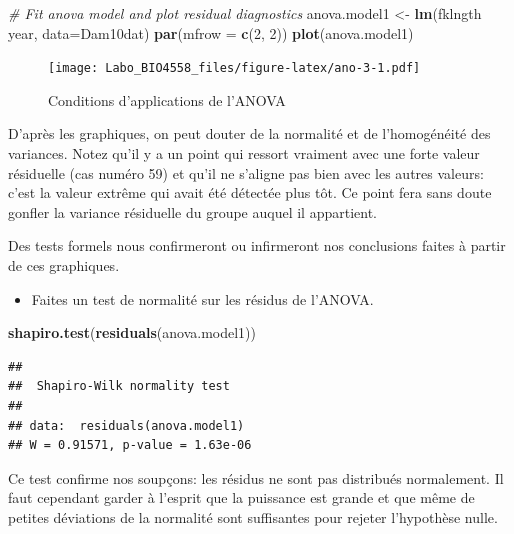 \documentclass[12pt,]{book}
\newenvironment{Shaded}{\begin{snugshade}}{\end{snugshade}}
\newcommand{\CommentTok}[1]{\textcolor[rgb]{0.37,0.37,0.37}{\textit{#1}}}
\newcommand{\DataTypeTok}[1]{\textcolor[rgb]{0.27,0.27,0.27}{#1}}
\newcommand{\DecValTok}[1]{\textcolor[rgb]{0.06,0.06,0.06}{#1}}
\newcommand{\KeywordTok}[1]{\textcolor[rgb]{0.27,0.27,0.27}{\textbf{#1}}}
\newcommand{\NormalTok}[1]{#1}
\newcommand{\OperatorTok}[1]{\textcolor[rgb]{0.43,0.43,0.43}{\textbf{#1}}}
\newcommand{\StringTok}[1]{\textcolor[rgb]{0.5,0.5,0.5}{#1}}
\providecommand{\tightlist}{%
  \setlength{\itemsep}{0pt}\setlength{\parskip}{0pt}}
\begin{document}
\begin{Shaded}
\begin{Highlighting}[]
\CommentTok{# Fit anova model and plot residual diagnostics}
\NormalTok{anova.model1 <-}\StringTok{ }\KeywordTok{lm}\NormalTok{(fklngth }\OperatorTok{~}\StringTok{ }\NormalTok{year, }\DataTypeTok{data=}\NormalTok{Dam10dat)}
\KeywordTok{par}\NormalTok{(}\DataTypeTok{mfrow =} \KeywordTok{c}\NormalTok{(}\DecValTok{2}\NormalTok{, }\DecValTok{2}\NormalTok{))}
\KeywordTok{plot}\NormalTok{(anova.model1)}
\end{Highlighting}
\end{Shaded}

\begin{figure}
\centering
\texttt{[image: Labo\_BIO4558\_files/figure-latex/ano-3-1.pdf]}
\caption{\label{fig:ano-3}Conditions d'applications de l'ANOVA}
\end{figure}

D'après les graphiques, on peut douter de la normalité et de l'homogénéité des variances. Notez qu'il y a un point qui ressort vraiment avec une forte valeur résiduelle (cas numéro 59) et qu'il ne s'aligne pas bien avec les autres valeurs: c'est la valeur extrême qui avait été détectée plus tôt. Ce point fera sans doute gonfler la variance résiduelle du groupe auquel il appartient.

Des tests formels nous confirmeront ou infirmeront nos conclusions faites à partir de ces graphiques.

\begin{itemize}
\tightlist
\item
  Faites un test de normalité sur les résidus de l'ANOVA.
\end{itemize}

\begin{Shaded}
\begin{Highlighting}[]
\KeywordTok{shapiro.test}\NormalTok{(}\KeywordTok{residuals}\NormalTok{(anova.model1))}
\end{Highlighting}
\end{Shaded}

\begin{verbatim}
## 
## 	Shapiro-Wilk normality test
## 
## data:  residuals(anova.model1)
## W = 0.91571, p-value = 1.63e-06
\end{verbatim}

Ce test confirme nos soupçons: les résidus ne sont pas distribués normalement. Il faut cependant garder à l'esprit que la puissance est grande et que même de petites déviations de la normalité sont suffisantes pour rejeter l'hypothèse nulle.
\end{document}
